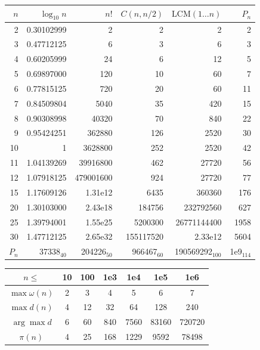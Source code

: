 \begin{table}[H]
	\centering
	\small
	\setlength{\tabcolsep}{4pt}
	\renewcommand\arraystretch{0.8}
	\begin{tabular}{|r|r|r|r|r|r|}
		\hline
		\rowcolor{black!10} $n$ & $\log_{10} n$ & $n!$ & $C(n,n/2)$ & $\mathrm{LCM}(1\dots n)$ & $P_n$\\
		\hline
		2 & 0.30102999 & 2 & 2 & 2 & 2\\
		\hline
		3 & 0.47712125 & 6 & 3 & 6 & 3\\
		\hline
		4 & 0.60205999 & 24 & 6 & 12 & 5\\
		\hline
		5 & 0.69897000 & 120 & 10 & 60 & 7\\
		\hline
		6 & 0.77815125 & 720 & 20 & 60 & 11\\
		\hline
		7 & 0.84509804 & 5040 & 35 & 420 & 15\\
		\hline
		8 & 0.90308998 & 40320 & 70 & 840 & 22\\
		\hline
		9 & 0.95424251 & 362880 & 126 & 2520 & 30\\
		\hline
		10 & 1 & 3628800 & 252  & 2520 & 42\\
		\hline
		11 & 1.04139269 & 39916800 & 462  & 27720 & 56\\
		\hline
		12 & 1.07918125 & 479001600 & 924 & 27720 & 77\\
		\hline
		15 & 1.17609126 & 1.31e{12} & 6435 & 360360 & 176\\
		\hline
		20 & 1.30103000 & 2.43e{18} & 184756 & 232792560 & 627\\
		\hline
		25 & 1.39794001 & 1.55e{25} & 5200300 & 26771144400 & 1958\\
		\hline
		30 & 1.47712125 & 2.65e{32} & 155117520 & 2.33e{12} & 5604\\
		\hline
		$P_n$ & 37338$_{40}$ & 204226$_{50}$ & 966467$_{60}$ & 190569292$_{100}$ & 1e{9}$_{114}$\\
		\hline
	\end{tabular}
		\begin{tabular}{|c|c|c|c|c|c|c|}
			\hline
			\rowcolor{black!10} $n \leq$ & 10 &  100 & 1e3 & 1e4 & 1e5 & 1e6 \\
			\hline
			$\max\omega(n)$ & 2 & 3 & 4 & 5 & 6 & 7  \\
			\hline
			$\max{d(n)}$ & 4 & 12 & 32 & 64 & 128 & 240 \\
			\hline
			$\arg\max d$ & 6 & 60 & 840 & 7560 & 83160 & 720720 \\
			\hline
			$\pi(n)$ & 4 & 25 & 168 & 1229 & 9592 & 78498 \\

\end{tabular}
\end{table}
